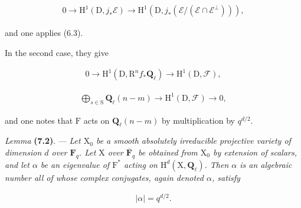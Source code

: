 \documentclass[10pt,leqno]{article}
\begin{document}
\begin{equation*}\begin{gathered}0 \longrightarrow  \mathrm{H}^{1}(\mathrm{D},j_{*}\mathcal{E} ) \longrightarrow  \mathrm{H}^{1}(\mathrm{D},j_{*}(\mathcal{E} /(\mathcal{E} \cap \mathcal{E} ^{\perp }))),\end{gathered}\tag{7.1.3′}\end{equation*}

\noindent and one applies (6.3).\par

\noindent In the second case, they give\par

\begin{equation*}\begin{gathered}0 \longrightarrow  \mathrm{H}^{1}(\mathrm{D},\mathrm{R}^{n} f_{*}\mathbf{Q}_{\ell }) \longrightarrow  \mathrm{H}^{1}(\mathrm{D},\mathcal{F} ),\end{gathered}\tag{7.1.4′}\end{equation*}

\begin{equation*}\begin{gathered}\bigoplus\limits_{s\in \mathrm{S}} \mathbf{Q}_{\ell }(n- m) \longrightarrow  \mathrm{H}^{1}(\mathrm{D},\mathcal{F} ) \longrightarrow  0,\end{gathered}\tag{7.1.5′}\end{equation*}

\noindent and one notes that \(\mathrm{F}\) acts on \(\mathbf{Q}_{\ell }(n- m)\) by multiplication by \(q^{d/2}\).\par

\noindent \emph{Lemma} \textbf{(7.2)}. — {\itshape Let \(\mathrm{X}_{0}\) be a smooth absolutely irreducible projective variety of dimension \(d\) over \(\mathbf{F}_{q}\). Let \(\mathrm{X}\) over \(\overline{\mathbf{F}}_{q}\) be obtained from \(\mathrm{X}_{0}\) by extension of scalars, and let \(\alpha \) be an eigenvalue of \(\mathrm{F}^{*}\) acting on \(\mathrm{H}^{d}(\mathrm{X},\mathbf{Q}_{\ell })\). Then \(\alpha \) is an algebraic number all of whose complex conjugates, again denoted \(\alpha \), satisfy}\par

\begin{equation*}\begin{gathered}|\alpha |=q^{d/2}.\end{gathered}\end{equation*}
\end{document}
